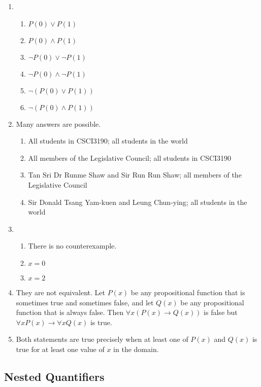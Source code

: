 \documentclass{sig-alternate-05-2015}
\begin{document}
\begin{enumerate}
\item 
\begin{enumerate}
	\item $P(0) \vee P(1)$
	\item $P(0) \wedge P(1)$
	\item $\neg P(0) \vee \neg P(1)$
	\item $\neg P(0) \wedge \neg P(1)$
	\item $\neg(P(0) \vee P(1))$
	\item $\neg(P(0) \wedge P(1))$
\end{enumerate}

\item Many answers are possible.
\begin{enumerate}
	\item All students in CSCI3190; all students in	the world
	\item All members of the Legislative Council; all students in CSCI3190
	\item Tan Sri Dr Runme Shaw and Sir Run Run Shaw; all members of the Legislative Council
	\item Sir Donald Tsang Yam-kuen and Leung Chun-ying; all students in the world
\end{enumerate}

\item 
\begin{enumerate}
	\item There is no counterexample.
	\item $x = 0$
	\item $x = 2$
\end{enumerate}

\item They are not equivalent.
Let $P(x)$ be any propositional function that is sometimes
true and sometimes false, and let $Q(x)$ be any propositional
function that is always false. Then $\forall x (P(x) \rightarrow Q(x))$ is false
but $\forall x P(x) \rightarrow \forall x Q(x)$ is true.

\item Both statements are
true precisely when at least one of $P(x)$ and $Q(x)$ is true for
at least one value of $x$ in the domain.

\end{enumerate}

\subsection{Nested Quantifiers}
\end{document}
